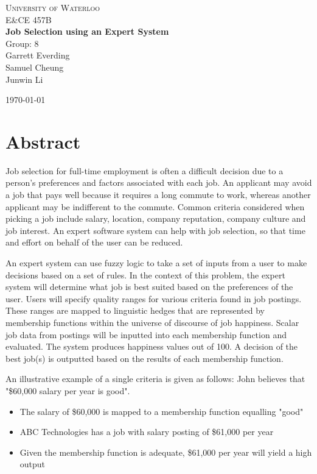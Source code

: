 \documentclass[12pt,fleqn,reqno,letterpaper]{article}
\begin{document}
\begin{titlepage}
\begin{center}
  \textsc{\LARGE University of Waterloo}\\[0.5cm]
  \textsc{\Large E\&CE 457B}\\[0.5cm]
  \vfill
  { \huge \bfseries Job Selection using an Expert System \\[0.4cm] }
  \vfill
  Group: 8 \\
  Garrett Everding \\
  Samuel Cheung \\
  Junwin Li

  \vfill
  \today
\end{center}
\end{titlepage}
\tableofcontents
\clearpage
\listoffigures
\clearpage
\listoftables
\clearpage

\section{Abstract}
Job selection for full-time employment is often a difficult decision due to a person’s preferences and factors associated with each job. An applicant may avoid a job that pays well because it requires a long commute to work, whereas another applicant may be indifferent to the commute. Common criteria considered when picking a job include salary, location, company reputation, company culture and job interest. An expert software system can help with job selection, so that time and effort on behalf of the user can be reduced.

An expert system can use fuzzy logic to take a set of inputs from a user to make decisions based on a set of rules. In the context of this problem, the expert system will determine what job is best suited based on the preferences of the user. Users will specify quality ranges for various criteria found in job postings. These ranges are mapped to linguistic hedges that are represented by membership functions within the universe of discourse of job happiness. Scalar job data from postings will be inputted into each membership function and evaluated. The system produces happiness values out of 100. A decision of the best job(s) is outputted based on the results of each membership function.

An illustrative example of a single criteria is given as follows: John believes that "\$60,000 salary per year is good".
\begin{itemize}
  \item The salary of \$60,000 is mapped to a membership function equalling "good"
  \item ABC Technologies has a job with salary posting of \$61,000 per year
  \item Given the membership function is adequate, \$61,000 per year will yield a high output
\end{itemize}
\nocite{FLS_MD,FLS_KD,FLS_ANN}
\end{document}
